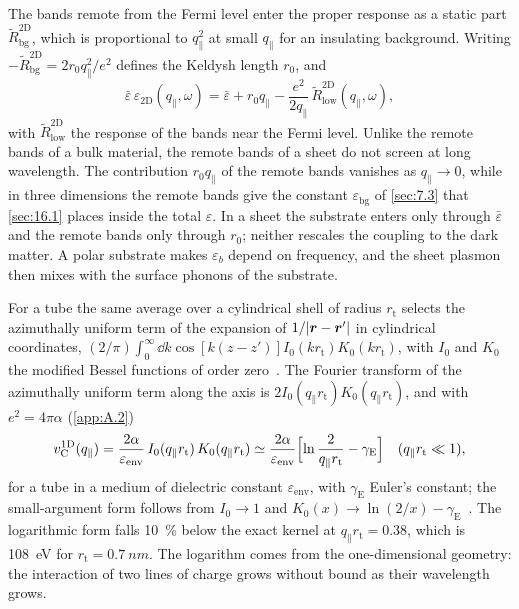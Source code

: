 The bands remote from the Fermi level enter the proper response as a static part $\tilde R^{\mathrm{2D}}_{\mathrm{bg}}$, which is proportional to $q_\parallel^2$ at small $q_\parallel$ for an insulating background. Writing $-\tilde R^{\mathrm{2D}}_{\mathrm{bg}} = 2r_0q_\parallel^2/e^2$ defines the Keldysh length $r_0$, and
\begin{equation}
  \bar\varepsilon\,\varepsilon_{\mathrm{2D}}(q_\parallel,\omega) = \bar\varepsilon + r_0q_\parallel - \frac{e^2}{2q_\parallel}\,\tilde R^{\mathrm{2D}}_{\mathrm{low}}(q_\parallel,\omega) ,
  \label{eq:16.2-keldysh}
\end{equation}
with $\tilde R^{\mathrm{2D}}_{\mathrm{low}}$ the response of the bands near the Fermi level. Unlike the remote bands of a bulk material, the remote bands of a sheet do not screen at long wavelength. The contribution $r_0q_\parallel$ of the remote bands vanishes as $q_\parallel \to 0$, while in three dimensions the remote bands give the constant $\varepsilon_{\mathrm{bg}}$ of \cref{sec:7.3} that \cref{sec:16.1} places inside the total $\varepsilon$. In a sheet the substrate enters only through $\bar\varepsilon$ and the remote bands only through $r_0$; neither rescales the coupling to the dark matter. A polar substrate makes $\varepsilon_b$ depend on frequency, and the sheet plasmon then mixes with the surface phonons of the substrate.

For a tube the same average over a cylindrical shell of radius $r_{\mathrm{t}}$ selects the azimuthally uniform term of the expansion of $1/|\bm{r} - \bm{r}'|$ in cylindrical coordinates, $(2/\pi)\int_0^\infty\dd k\cos[k(z - z')]I_0(kr_{\mathrm{t}})K_0(kr_{\mathrm{t}})$, with $I_0$ and $K_0$ the modified Bessel functions of order zero~\cite[Sect.~10.25]{olver2010nist}. The Fourier transform of the azimuthally uniform term along the axis is $2I_0(q_\parallel r_{\mathrm{t}})K_0(q_\parallel r_{\mathrm{t}})$, and with $e^2 = 4\pi\alpha$ (\cref{app:A.2})
\begin{equation}
  v_{\mathrm{C}}^{\mathrm{1D}}(q_\parallel) = \frac{2\alpha}{\varepsilon_{\mathrm{env}}}\,I_0(q_\parallel r_{\mathrm{t}})\,K_0(q_\parallel r_{\mathrm{t}}) \simeq \frac{2\alpha}{\varepsilon_{\mathrm{env}}}\Bigl[\ln\frac{2}{q_\parallel r_{\mathrm{t}}} - \gamma_{\mathrm{E}}\Bigr] \quad (q_\parallel r_{\mathrm{t}} \ll 1) ,
  \label{eq:16.2-kernel1D}
\end{equation}
for a tube in a medium of dielectric constant $\varepsilon_{\mathrm{env}}$, with $\gamma_{\mathrm{E}}$ Euler's constant; the small-argument form follows from $I_0 \to 1$ and $K_0(x) \to \ln(2/x) - \gamma_{\mathrm{E}}$~\cite[Eqs.~(10.30.1), (10.31.2)]{olver2010nist}. The logarithmic form falls \SI{10}{\percent} below the exact kernel at $q_\parallel r_{\mathrm{t}} = 0.38$, which is \SI{108}{eV} for $r_{\mathrm{t}} = \SI{0.7}{nm}$. The logarithm comes from the one-dimensional geometry: the interaction of two lines of charge grows without bound as their wavelength grows.

